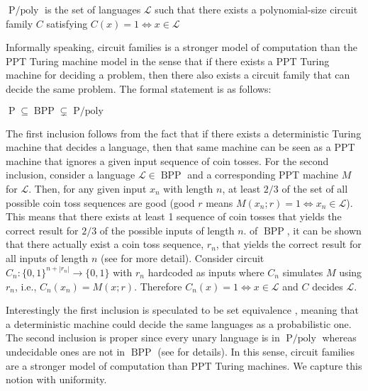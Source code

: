 \begin{definition}
$\operatorname{P/poly}$ is the set of languages $\mathscr{L}$ such that there exists a polynomial-size circuit family $C$ satisfying $C(x) = 1 \iff x \in \mathscr{L}$ 
\end{definition}

Informally speaking, circuit families is a stronger model of computation than the PPT Turing machine model in the sense that if there exists a PPT Turing machine for deciding a problem, then there also exists a circuit family that can decide the same problem. The formal statement is as follows: 

\begin{theorem}
    \label{thm:compl-class}
    $\operatorname{P} \subseteq \operatorname{BPP} \subsetneq \operatorname{P/poly}$
\end{theorem}
    

The first inclusion follows from the fact that if there exists a deterministic Turing machine that decides a language, then that same machine can be seen as a PPT machine that ignores a given input sequence of coin tosses. For the second inclusion, consider a language $\mathscr{L} \in \operatorname{BPP}$ and a corresponding PPT machine $M$ for $\mathscr{L}$. Then, for any given input $x_n$ with length $n$, at least $2/3$ of the set of all possible coin toss sequences are good (good $r$ means $M(x_n;r) = 1 \iff x_n \in \mathscr{L}$). This means that there exists at least 1 sequence of coin tosses that yields the correct result for $2/3$ of the possible inputs of length $n$.  of $\operatorname{BPP}$, it can be shown that there actually exist a coin toss sequence, $r_n$, that yields the correct result for all inputs of length $n$ (see \cite{Adleman1978TwoTO,Gol01} for more detail). Consider circuit $C_n \colon \{0,1\}^{n+|r_n|} \to \{0,1\}$ with $r_n$ hardcoded as inputs where $C_n$ simulates $M$ using $r_n$, i.e., $C_n(x_n) = M(x;r)$. Therefore $C_n(x) = 1 \iff x \in \mathscr{L}$ and $C$ decides $\mathscr{L}$.

Interestingly the first inclusion is speculated to be set equivalence \cite[pp. 126]{Arora}, meaning that a deterministic machine could decide the same languages as a probabilistic one. The second inclusion is proper since every unary language is in $\operatorname{P/poly}$ whereas undecidable ones are not in $\operatorname{BPP}$ (see \cite[pp. 110]{Arora} for details). In this sense, circuit families are a stronger model of computation than PPT Turing machines. We capture this notion with uniformity. 

